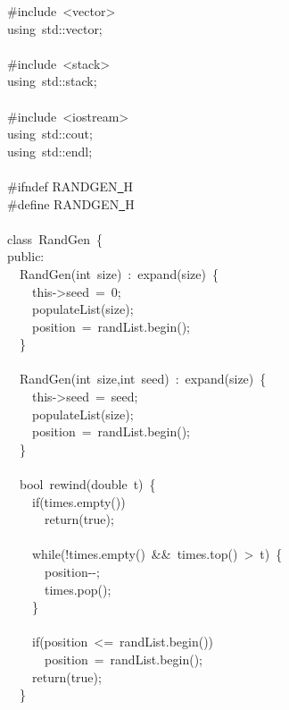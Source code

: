 {\ttfamily \raggedright \small
\#include\ <{}vector>{}\\
using\ std::vector;\\
\ \\
\#include\ <{}stack>{}\\
using\ std::stack;\\
\ \\
\#include\ <{}iostream>{}\\
using\ std::cout;\\
using\ std::endl;\\
\ \\
\#ifndef RANDGEN\underline\ H\\
\#define RANDGEN\underline\ H\\
\ \\
class\ RandGen\ \{\\
public:\\
\ \ RandGen(int\ size)\ :\ expand(size)\ \{\\
\ \ \ \ this-{}>{}seed\ =\ 0;\\
\ \ \ \ populateList(size);\\
\ \ \ \ position\ =\ randList.begin();\\
\ \ \}\\
\ \\
\ \ RandGen(int\ size,int\ seed)\ :\ expand(size)\ \{\\
\ \ \ \ this-{}>{}seed\ =\ seed;\\
\ \ \ \ populateList(size);\\
\ \ \ \ position\ =\ randList.begin();\\
\ \ \}\\
\ \\
\ \ bool\ rewind(double\ t)\ \{\\
\ \ \ \ if(times.empty())\\
\ \ \ \ \ \ return(true);\\
\ \\
\ \ \ \ while(!times.empty()\ \&\&\ times.top()\ >{}\ t)\ \{\\
\ \ \ \ \ \ position-{}-{};\\
\ \ \ \ \ \ times.pop();\\
\ \ \ \ \}\\
\ \\
\ \ \ \ if(position\ <{}=\ randList.begin())\\
\ \ \ \ \ \ position\ =\ randList.begin();\\
\ \ \ \ return(true);\\
\ \ \}\\
}
